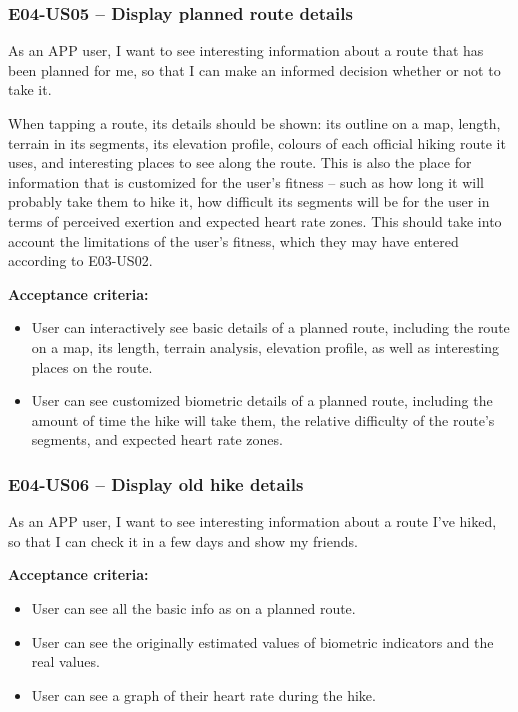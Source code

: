 \subsubsection*{E04-US05 -- Display planned route details}
As an APP user, I want to see interesting information about a route that has been planned for me, so that I can make an informed decision whether or not to take it.

When tapping a route, its details should be shown: its outline on a map, length, terrain in its segments, its elevation profile, colours of each official hiking route it uses, and interesting places to see along the route.
This is also the place for information that is customized for the user's fitness -- such as how long it will probably take them to hike it, how difficult its segments will be for the user in terms of perceived exertion and expected heart rate zones.
This should take into account the limitations of the user's fitness, which they may have entered according to E03-US02.

\textbf{Acceptance criteria:}
\begin{itemize}
    \item User can interactively see basic details of a planned route, including the route on a map, its length, terrain analysis, elevation profile, as well as interesting places on the route.
    \item User can see customized biometric details of a planned route, including the amount of time the hike will take them, the relative difficulty of the route's segments, and expected heart rate zones.
\end{itemize}

\subsubsection*{E04-US06 -- Display old hike details}
As an APP user, I want to see interesting information about a route I've hiked, so that I can check it in a few days and show my friends.

\textbf{Acceptance criteria:}
\begin{itemize}
    \item User can see all the basic info as on a planned route.
    \item User can see the originally estimated values of biometric indicators and the real values.
    \item User can see a graph of their heart rate during the hike.
\end{itemize}

